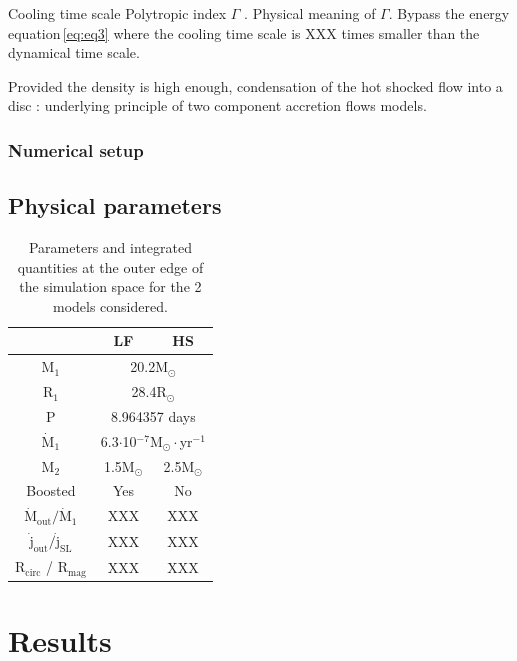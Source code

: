 \documentclass[a4paper,fleqn,usenatbib]{mnras}
\begin{document}
Cooling time scale \citep{Schure2009}
Polytropic index $\Gamma$ \citep{Horedt2000}. Physical meaning of $\Gamma$. Bypass the energy equation\,\ref{eq:eq3} where the cooling time scale is XXX times smaller than the dynamical time scale.

Provided the density is high enough, condensation of the hot shocked flow into a disc \citep[][and references therein]{Taam2018} : underlying principle of two component accretion flows models.

\subsubsection{Numerical setup}
\label{sec:num_set}

\subsection{Physical parameters}
\label{sec:params}

\begin{table}
\centering
\caption{Parameters and integrated quantities at the outer edge of the simulation space for the 2 models considered.}
\label{tab:params}
\begin{tabularx}{\linewidth}{c|c|c}
   & LF & HS \\
  \hline
  M$_1$ & \multicolumn{2}{c}{20.2M$_{\odot}$} \\
  R$_1$ & \multicolumn{2}{c}{28.4R$_{\odot}$} \\
  P & \multicolumn{2}{c}{8.964357 days} \\  
  $\dot{\text{M}}_1$ & \multicolumn{2}{c}{6.3$\cdot$10$^{-7}$M$_{\odot}\cdot$yr$^{-1}$} \\
  \hline
  M$_2$ & 1.5M$_{\odot}$  & 2.5M$_{\odot}$  \\
  Boosted & Yes & No  \\
  \hline
  $\dot{\text{M}}_{\text{out}}/\dot{\text{M}}_1$ & XXX & XXX  \\
  $\dot{\text{j}}_{\text{out}}/\dot{\text{j}}_{\text{SL}}$ & XXX & XXX \\
  R$_{\text{circ}}$ / R$_{\text{mag}}$ & XXX & XXX \\
\end{tabularx}
\end{table}


\section{Results}
\label{sec:res}
\end{document}
